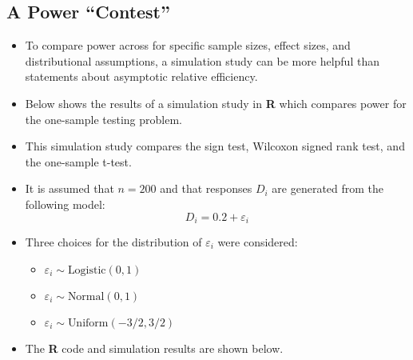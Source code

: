 \documentclass[]{book}
\providecommand{\tightlist}{%
  \setlength{\itemsep}{0pt}\setlength{\parskip}{0pt}}
\begin{document}
\hypertarget{a-power-contest}{%
\subsection{A Power ``Contest''}\label{a-power-contest}}

\begin{itemize}
\item
  To compare power across for specific sample sizes, effect sizes, and
  distributional assumptions, a simulation study can be more
  helpful than statements about asymptotic relative efficiency.
\item
  Below shows the results of a simulation study in \textbf{R} which compares
  power for the one-sample testing problem.
\item
  This simulation study compares the sign test, Wilcoxon signed rank test,
  and the one-sample t-test.
\item
  It is assumed that \(n = 200\) and that responses \(D_{i}\) are generated from
  the following model:
  \begin{equation}
  D_{i} = 0.2 + \varepsilon_{i}
  \end{equation}
\item
  Three choices for the distribution of \(\varepsilon_{i}\) were considered:

  \begin{itemize}
  \tightlist
  \item
    \(\varepsilon_{i} \sim \textrm{Logistic}(0, 1)\)
  \item
    \(\varepsilon_{i} \sim \textrm{Normal}(0, 1)\)
  \item
    \(\varepsilon_{i} \sim \textrm{Uniform}(-3/2, 3/2)\)
  \end{itemize}
\item
  The \textbf{R} code and simulation results are shown below.
\end{itemize}
\end{document}
